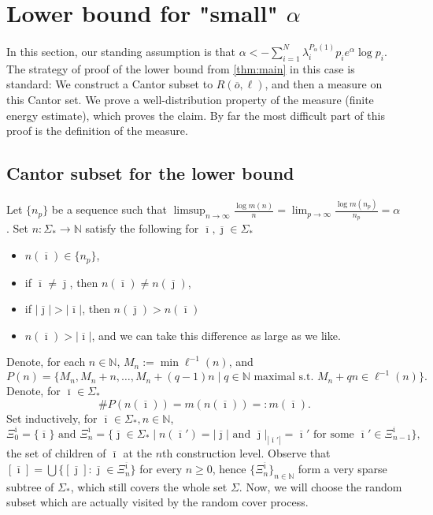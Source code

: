 \documentclass[12pt,]{article}
\theoremstyle{definition}
\theoremstyle{remark}
\renewcommand{\Bbb}[1]{\mathbb{#1}}
\newcommand{\bbN}{{\Bbb N}}         %
\newcommand{\0}{\mathbf{0}}
\newcommand{\bi}{{\overline {\imath}}}
\newcommand{\bj}{{\overline  {\jmath}}}
\newcommand{\bo}{{\overline o}}
\begin{document}
\section{Lower bound for "small" \texorpdfstring{$\alpha$}{a}}

In this section, our standing assumption is that
$\alpha<-\sum_{i=1}^N\lambda_i^{P_\alpha(1)}p_ie^{\alpha}\log p_i$. The strategy of proof of the
lower bound from \cref{thm:main} in this case is standard: We construct a Cantor subset to $R(\bo,
\ell)$, and then a measure on this Cantor set. We prove a well-distribution property of the measure
(finite energy estimate), which proves the claim. By far the most difficult part of this proof is
the definition of the measure.

\subsection{Cantor subset for the lower bound}\label{sec:cantor}

Let $\{n_p\}$ be a sequence such that $\limsup_{n\to\infty}\frac{\log
m(n)}{n}=\lim_{p\to\infty}\frac{\log m(n_p)}{n_p}=\alpha$. Set $n: \Sigma_*\to \bbN$ satisfy the
following for $\bi, \bj\in \Sigma_*$
\begin{itemize}
  \item $n(\bi)\in\{n_p\}$,
  \item if $\bi\neq \bj$, then $n(\bi)\neq n(\bj)$,
  \item if $|\bj|>|\bi|$, then $n(\bj) > n(\bi)$
  \item $n(\bi) > |\bi|$, and we can take this difference as large as we like.
\end{itemize}


Denote, for each $n\in \bbN$, $M_n:=\min\ell^{-1}(n)$, and
\[
  P(n)=\{M_n, M_n+n, \dots, M_n +(q-1)n\mid q\in \mathbb N\text{ maximal s.t. } M_n+qn\in \ell^{-1}(n)\}.
\]
Denote, for $\bi\in \Sigma_*$
\[
  \# P(n(\bi))= m(n(\bi))=: m(\bi).
\]
Set inductively, for $\bi\in\Sigma_*, n\in \bbN$,
\[
  \Xi_0^{\bi}=\{\bi\} \text{ and }\Xi_n^\bi=\{\bj\in \Sigma_*\mid n(\bi')=|\bj|\text{ and
  }\bj|_{|\bi'|}=\bi'\text{ for some }\bi'\in \Xi_{n-1}^\bi\},
\]
the set of children of $\bi$ at the $n$th construction level. Observe that
$[\bi]=\bigcup\{[\bj]:\bj\in\Xi_n^\bi\}$ for every $n\geq0$, hence $\{\Xi_n^\bi\}_{n\in\bbN}$ form a
very sparse subtree of $\Sigma_*$, which still covers the whole set $\Sigma$. Now, we will choose
the random subset which are actually visited by the random cover process.
\end{document}
